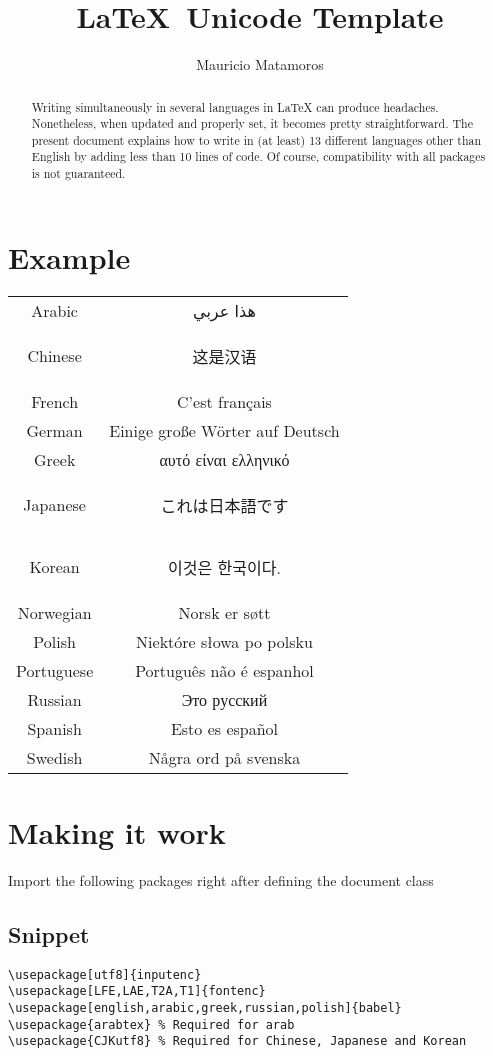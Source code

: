 \documentclass{article}
\title{\LaTeX~Unicode Template}
\author{Mauricio Matamoros}
\newcommand{\textcn}[1]{\begin{CJK}{UTF8}{gbsn}#1\end{CJK}}
\newcommand{\textjp}[1]{\begin{CJK}{UTF8}{min}#1\end{CJK}}
\newcommand{\textko}[1]{\begin{CJK}{UTF8}{mj}#1\end{CJK}}
\begin{document}
\maketitle

\begin{abstract}
Writing simultaneously in several languages in \LaTeX{} can produce headaches.
Nonetheless, when updated and properly set, it becomes pretty straightforward.
The present document explains how to write in (at least) 13 different languages other than English by adding less than 10 lines of code.
Of course, compatibility with all packages is not guaranteed.
\end{abstract}

\section{Example}
\begin{center}
\begin{tabular}{c c}
Arabic     & \foreignlanguage{arabic}{هذا عربي} \\
Chinese    & \textcn{这是汉语} \\
French     & C'est français \\
German     & Einige große Wörter auf Deutsch \\
Greek      & \foreignlanguage{greek}{αυτό είναι ελληνικό} \\
Japanese   & \textjp{これは日本語です} \\
Korean     & \textko{이것은 한국이다.} \\
Norwegian  & Norsk er søtt \\
Polish     & Niektóre słowa po polsku \\
Portuguese & Português não é espanhol \\
Russian    & \foreignlanguage{russian}{Это русский} \\
Spanish    & Esto es español \\
Swedish    & Några ord på svenska \\
\end{tabular}
\end{center}

\section{Making it work}
Import the following packages right after defining the document class

\subsection{Snippet}
\begin{verbatim}
\usepackage[utf8]{inputenc}
\usepackage[LFE,LAE,T2A,T1]{fontenc}
\usepackage[english,arabic,greek,russian,polish]{babel}
\usepackage{arabtex} % Required for arab
\usepackage{CJKutf8} % Required for Chinese, Japanese and Korean
\end{verbatim}
\end{document}

